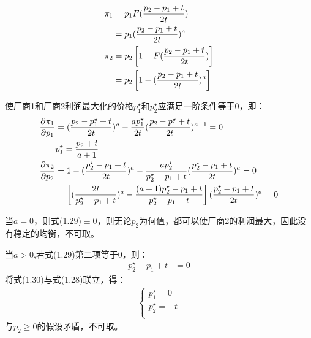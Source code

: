 \begin{align}
    \pi_1 &=p_1F(\frac{p_2-p_1+t}{2t})   \notag \\
    &=p_1(\frac{p_2-p_1+t}{2t})^a \\
    \pi_2 &=p_2\left[1-F(\frac{p_2-p_1+t}{2t}) \right]  \notag \\
    &=p_2\left[1-(\frac{p_2-p_1+t}{2t})^a\right] 
\end{align}

使厂商1和厂商2利润最大化的价格$p_1^{\star}$和$p_2^{\star}$应满足一阶条件等于0，即：
\begin{align}
    \frac{\partial \pi_1 }{\partial p_1} &=(\frac{p_2-p_1^{\star}+t}{2t})^a -\frac{ap_1^{\star}}{2t}(\frac{p_2-p_1^{\star}+t}{2t})^{a-1} =0\notag \\
    &p_1^{\star}=\frac{p_2+t}{a+1} \\
    \frac{\partial \pi_2 }{\partial p_2} 
    &=1-(\frac{p_2^{\star}-p_1+t}{2t})^a-\frac{ap_2^{\star}}{p_2^{\star}-p_1+t}(\frac{p_2^{\star}-p_1+t}{2t})^a=0 \notag \\
    &=\left[(\frac{2t}{p_2^{\star}-p_1+t})^a-\frac{(a+1)p_2^{\star}-p_1+t}{p_2^{\star}-p_1+t}\right](\frac{p_2^{\star}-p_1+t}{2t})^a=0 
\end{align}

当$a=0$，则式(1.29)$\equiv 0 $，则无论$p_2$为何值，都可以使厂商2的利润最大，因此没有稳定的均衡，不可取。

当$a>0$,若式(1.29)第二项等于0，则：
\begin{align}
    p_2^{\star}-p_1+t &= 0 
\end{align}
将式(1.30)与式(1.28)联立，得：
\begin{align}
    \begin{cases}
     p_1^{\star} = 0 \\
     p_2^{\star} =-t  \\
    \end{cases}
\end{align}
与$p_2\geq0$的假设矛盾，不可取。

